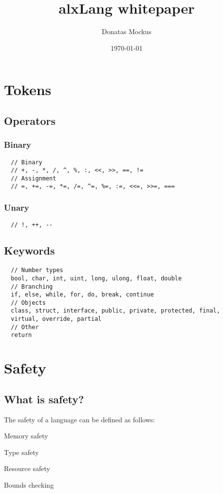 \documentclass[border=1in]{standalone}
\title{\textbf{alxLang whitepaper}}
\date{\today}
\begin{document}
\begin{minipage}{21cm}
\lstset{language=[Sharp]C}
\author{Donatas Mockus}
\maketitle

\section{Tokens}
\subsection{Operators}
\subsubsection{Binary}
\begin{lstlisting}
  // Binary
  // +, -, *, /, ^, %, :, <<, >>, ==, !=
  // Assignment
  // =, +=, -=, *=, /=, ^=, %=, :=, <<=, >>=, ===
\end{lstlisting}
\subsubsection{Unary}
\begin{lstlisting}
  // !, ++, --
\end{lstlisting}

\subsection{Keywords}
\begin{lstlisting}
  // Number types
  bool, char, int, uint, long, ulong, float, double
  // Branching
  if, else, while, for, do, break, continue
  // Objects
  class, struct, interface, public, private, protected, final,
  virtual, override, partial
  // Other
  return
\end{lstlisting}

\section{Safety}

\subsection{What is safety?}
The safety of a language can be defined as follows:
\begin{list}{-}{}
  \item Memory safety
  \item Type safety
  \item Resource safety
  \item Bounds checking
\end{list}


\end{minipage}
\end{document}
